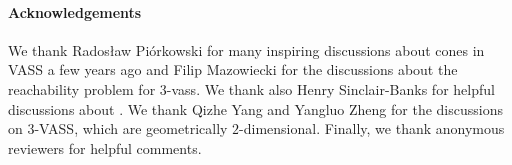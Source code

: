 \documentclass[a4paper, UKenglish, cleveref, autoref, thm-restate]{lipics-v2021}
\newcommand{\vass}{{\sc vass}\xspace}
\newcommand{\tvass}{\parvass 3}
\newcommand{\parvass}[1]{{$#1$-\vass}\xspace}
\begin{document}
 


\paragraph*{Acknowledgements}
We thank Radosław Piórkowski for many inspiring discussions about cones in VASS a few years ago
and Filip Mazowiecki for the discussions about the reachability problem for \tvass.
We thank also Henry Sinclair-Banks for helpful discussions about \cite[Thm 4.16]{DBLP:conf/focs/0001CMOSW24}.
We thank Qizhe Yang and Yangluo Zheng for the discussions on $3$-VASS, which are geometrically $2$-dimensional.
Finally, we thank anonymous reviewers for helpful comments.






\newpage


\appendix
\end{document}
